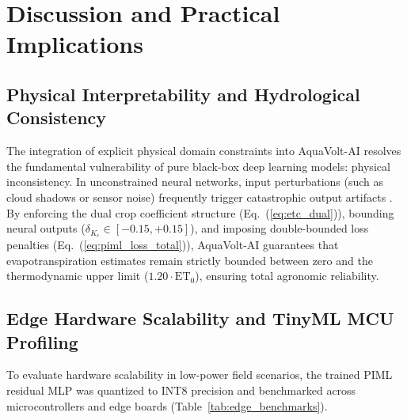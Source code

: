 \documentclass[sn-mathphys-num,Numbered]{sn-jnl}
\begin{document}
\section{Discussion and Practical Implications}\label{sec:discussion}

\subsection{Physical Interpretability and Hydrological Consistency}\label{sec:disc_physics}
The integration of explicit physical domain constraints into AquaVolt-AI resolves the fundamental vulnerability of pure black-box deep learning models: physical inconsistency. In unconstrained neural networks, input perturbations (such as cloud shadows or sensor noise) frequently trigger catastrophic output artifacts \cite{Read2019,Reichstein2019}. By enforcing the dual crop coefficient structure (Eq.~(\ref{eq:etc_dual})), bounding neural outputs ($\delta_{K_c} \in [-0.15, +0.15]$), and imposing double-bounded loss penalties (Eq.~(\ref{eq:piml_loss_total})), AquaVolt-AI guarantees that evapotranspiration estimates remain strictly bounded between zero and the thermodynamic upper limit ($1.20 \cdot \mathrm{ET}_0$), ensuring total agronomic reliability.

\subsection{Edge Hardware Scalability and TinyML MCU Profiling}\label{sec:disc_edge_tinyml}
To evaluate hardware scalability in low-power field scenarios, the trained PIML residual MLP was quantized to INT8 precision and benchmarked across microcontrollers and edge boards (Table~\ref{tab:edge_benchmarks}).

\begin{table}[htbp]
\centering
\caption{Edge Inference Latency, Memory Footprint, and Power Benchmarks for INT8 Quantized AquaVolt-AI PIML Model}
\label{tab:edge_benchmarks}
\end{table}
\end{document}
